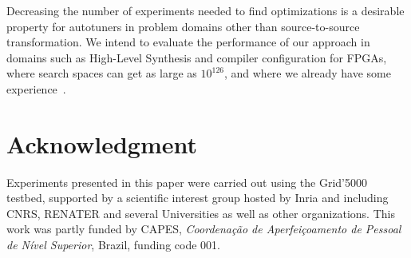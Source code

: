 \documentclass[conference]{IEEEtran}
\begin{document}
Decreasing the number of experiments needed to find optimizations is a desirable
property for autotuners in problem domains other than source-to-source
transformation. We intend to evaluate the performance of our approach in domains
such as High-Level Synthesis and compiler configuration for FPGAs, where search
spaces can get as large as \(10^{126}\), and where we already have some
experience~\cite{bruel2017autotuninghls}.
\section*{Acknowledgment}
\label{sec:org07b033b}
Experiments presented in this paper were carried out using the Grid'5000
testbed, supported by a scientific interest group hosted by Inria and including
CNRS, RENATER and several Universities as well as other organizations.
This work was partly funded by CAPES, \emph{Coordenação de Aperfeiçoamento de Pessoal
de Nível Superior}, Brazil, funding code 001.



\end{document}
